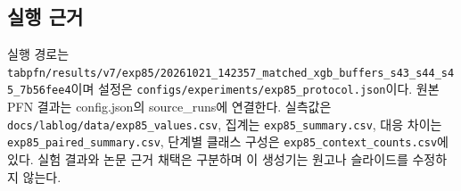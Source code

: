 \subsection{실행 근거}
실행 경로는 \texttt{tabpfn/\allowbreak{}\allowbreak{}r\allowbreak{}esults/\allowbreak{}\allowbreak{}v\allowbreak{}7/\allowbreak{}\allowbreak{}exp85/\allowbreak{}\allowbreak{}20261021\allowbreak{}\_\allowbreak{}\allowbreak{}142357\_\allowbreak{}\allowbreak{}matched\_\allowbreak{}\allowbreak{}xgb\_\allowbreak{}\allowbreak{}buff\allowbreak{}ers\_\allowbreak{}\allowbreak{}s43\_\allowbreak{}\allowbreak{}s44\_\allowbreak{}\allowbreak{}s45\_\allowbreak{}\allowbreak{}7b56fee4\allowbreak{}}이며 설정은 \texttt{configs/\allowbreak{}\allowbreak{}experime\allowbreak{}nts/\allowbreak{}\allowbreak{}exp8\allowbreak{}5\_\allowbreak{}\allowbreak{}protoc\allowbreak{}ol.\allowbreak{}json}이다. 원본 PFN 결과는 config.json의 source\_\allowbreak{}runs에 연결한다. 실측값은 \texttt{docs/\allowbreak{}\allowbreak{}lab\allowbreak{}log/\allowbreak{}\allowbreak{}data\allowbreak{}/\allowbreak{}\allowbreak{}exp85\_\allowbreak{}\allowbreak{}v\allowbreak{}alues.\allowbreak{}cs\allowbreak{}v}, 집계는 \texttt{exp85\_\allowbreak{}\allowbreak{}su\allowbreak{}mmary.\allowbreak{}cs\allowbreak{}v}, 대응 차이는 \texttt{exp85\_\allowbreak{}\allowbreak{}pa\allowbreak{}ired\_\allowbreak{}\allowbreak{}sum\allowbreak{}mary.\allowbreak{}csv\allowbreak{}}, 단계별 클래스 구성은 \texttt{exp85\_\allowbreak{}\allowbreak{}co\allowbreak{}ntext\_\allowbreak{}\allowbreak{}co\allowbreak{}unts.\allowbreak{}csv\allowbreak{}}에 있다. 실험 결과와 논문 근거 채택은 구분하며 이 생성기는 원고나 슬라이드를 수정하지 않는다.



